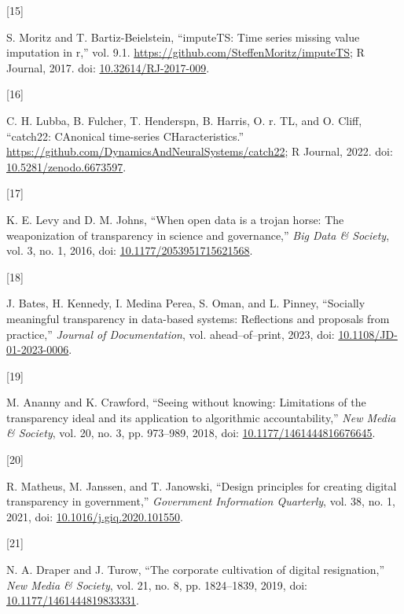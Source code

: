\documentclass{article}
\newlength{\cslhangindent}
\newlength{\csllabelwidth}
\newlength{\cslentryspacingunit} %
\newenvironment{CSLReferences}[2] %
 {%
  \setlength{\parindent}{0pt}
  \ifodd #1
  \let\oldpar\par
  \def\par{\hangindent=\cslhangindent\oldpar}
  \fi
  \setlength{\parskip}{#2\cslentryspacingunit}
 }%
 {}
\newcommand{\CSLLeftMargin}[1]{\parbox[t]{\csllabelwidth}{#1}}
\newcommand{\CSLRightInline}[1]{\parbox[t]{\linewidth - \csllabelwidth}{#1}\break}
\begin{document}
\begin{CSLReferences}{0}{0}
\leavevmode{}%
\CSLLeftMargin{{[}15{]} }
\CSLRightInline{S. Moritz and T. Bartiz-Beielstein, {``imputeTS: Time
series missing value imputation in r,''} vol. 9.1.
\url{https://github.com/SteffenMoritz/imputeTS}; R Journal, 2017. doi:
\href{https://doi.org/10.32614/RJ-2017-009}{10.32614/RJ-2017-009}.}

\leavevmode{}%
\CSLLeftMargin{{[}16{]} }
\CSLRightInline{C. H. Lubba, B. Fulcher, T. Henderspn, B. Harris, O. r.
TL, and O. Cliff, {``catch22: CAnonical time-series CHaracteristics.''}
\url{https://github.com/DynamicsAndNeuralSystems/catch22}; R Journal,
2022. doi:
\href{https://doi.org/10.5281/zenodo.6673597}{10.5281/zenodo.6673597}.}

\leavevmode{}%
\CSLLeftMargin{{[}17{]} }
\CSLRightInline{K. E. Levy and D. M. Johns, {``When open data is a
trojan horse: The weaponization of transparency in science and
governance,''} \emph{Big Data \& Society}, vol. 3, no. 1, 2016, doi:
\href{https://doi.org/10.1177/2053951715621568}{10.1177/2053951715621568}.}

\leavevmode{}%
\CSLLeftMargin{{[}18{]} }
\CSLRightInline{J. Bates, H. Kennedy, I. Medina Perea, S. Oman, and L.
Pinney, {``Socially meaningful transparency in data-based systems:
Reflections and proposals from practice,''} \emph{Journal of
Documentation}, vol. ahead--of--print, 2023, doi:
\href{https://doi.org/10.1108/JD-01-2023-0006}{10.1108/JD-01-2023-0006}.}

\leavevmode{}%
\CSLLeftMargin{{[}19{]} }
\CSLRightInline{M. Ananny and K. Crawford, {``Seeing without knowing:
Limitations of the transparency ideal and its application to algorithmic
accountability,''} \emph{New Media \& Society}, vol. 20, no. 3, pp.
973--989, 2018, doi:
\href{https://doi.org/10.1177/1461444816676645}{10.1177/1461444816676645}.}

\leavevmode{}%
\CSLLeftMargin{{[}20{]} }
\CSLRightInline{R. Matheus, M. Janssen, and T. Janowski, {``Design
principles for creating digital transparency in government,''}
\emph{Government Information Quarterly}, vol. 38, no. 1, 2021, doi:
\href{https://doi.org/10.1016/j.giq.2020.101550}{10.1016/j.giq.2020.101550}.}

\leavevmode{}%
\CSLLeftMargin{{[}21{]} }
\CSLRightInline{N. A. Draper and J. Turow, {``The corporate cultivation
of digital resignation,''} \emph{New Media \& Society}, vol. 21, no. 8,
pp. 1824--1839, 2019, doi:
\href{https://doi.org/10.1177/1461444819833331}{10.1177/1461444819833331}.}


\end{CSLReferences}
\end{document}
